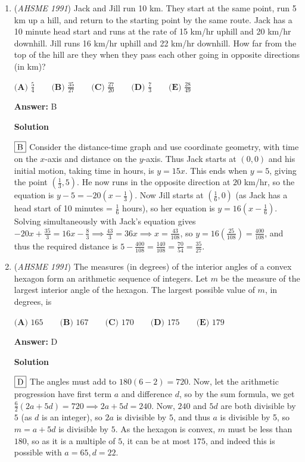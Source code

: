 \begin{enumerate}
	\item (\textit{AHSME 1991}) Jack and Jill run 10 km. They start at the same point, run 5 km up a hill, and return to the starting point by the same route. Jack has a 10 minute head start and runs at the rate of 15 km/hr uphill and 20 km/hr downhill. Jill runs 16 km/hr uphill and 22 km/hr downhill. How far from the top of the hill are they when they pass each other going in opposite directions (in km)?


 $\textbf{(A) } \frac{5}{4}\qquad \textbf{(B) } \frac{35}{27}\qquad \textbf{(C) } \frac{27}{20}\qquad \textbf{(D) } \frac{7}{3}\qquad \textbf{(E) } \frac{28}{49}$

 \textbf{Answer: }B



\textbf{Solution}

$\fbox{B}$ Consider the distance-time graph and use coordinate geometry, with time on the $x$-axis and distance on the $y$-axis. Thus Jack starts at $(0,0)$ and his initial motion, taking time in hours, is $y=15x$. This ends when $y=5$, giving the point $(\frac{1}{3}, 5)$. He now runs in the opposite direction at $20$ km/hr, so the equation is $y-5 = -20(x-\frac{1}{3})$. Now Jill starts at $(\frac{1}{6}, 0)$ (as Jack has a head start of 10 minutes = $\frac{1}{6}$ hours), so her equation is $y=16(x-\frac{1}{6}).$ Solving simultaneously with Jack's equation gives $-20x+\frac{35}{3} = 16x - \frac{8}{3} \implies \frac{43}{3} = 36x \implies x = \frac{43}{108}$, so $y = 16(\frac{25}{108}) = \frac{400}{108}$, and thus the required distance is $5 - \frac{400}{108} = \frac{140}{108} = \frac{70}{54} = \frac{35}{27}.$



	\item (\textit{AHSME 1991}) The measures (in degrees) of the interior angles of a convex hexagon form an arithmetic sequence of integers. Let $m$ be the measure of the largest interior angle of the hexagon. The largest possible value of $m$, in degrees, is


 $\textbf{(A) } 165\qquad \textbf{(B) } 167\qquad \textbf{(C) } 170\qquad \textbf{(D) } 175\qquad \textbf{(E) } 179$

 \textbf{Answer: }D



\textbf{Solution}

$\fbox{D}$ The angles must add to $180(6-2) = 720$. Now, let the arithmetic progression have first term $a$ and difference $d$, so by the sum formula, we get $\frac{6}{2}(2a+5d) = 720 \implies 2a+5d=240.$ Now, $240$ and $5d$ are both divisible by $5$ (as $d$ is an integer), so $2a$ is divisible by $5$, and thus $a$ is divisible by 5, so $m = a+5d$ is divisible by $5$. As the hexagon is convex, $m$ must be less than $180$, so as it is a multiple of $5$, it can be at most $175$, and indeed this is possible with $a = 65, d = 22.$




\end{enumerate}

